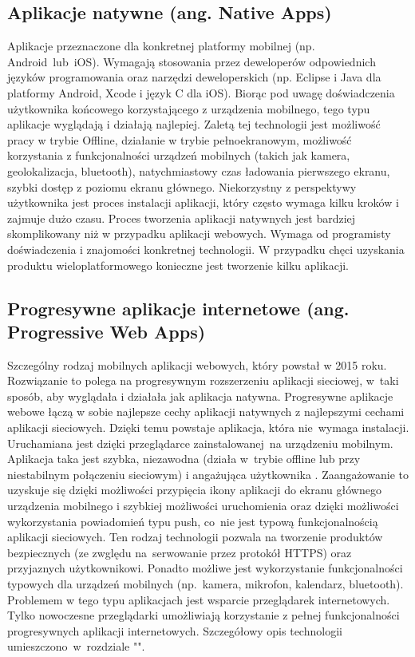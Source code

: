 \documentclass[a4paper,12pt,twoside,openany]{report}
\begin{document}
\subsection*{Aplikacje natywne (ang. Native Apps)}
\noindent Aplikacje przeznaczone dla konkretnej platformy mobilnej (np. Android~lub~iOS). Wymagają stosowania przez deweloperów odpowiednich języków programowania oraz narzędzi deweloperskich (np. Eclipse i Java dla platformy Android, Xcode i język C dla iOS). Biorąc pod uwagę do\'swiadczenia użytkownika końcowego korzystającego z urządzenia mobilnego, tego typu aplikacje wyglądają i działają najlepiej. Zaletą tej technologii jest możliwo\'sć pracy w trybie Offline, działanie w trybie pełnoekranowym, możliwo\'sć korzystania z funkcjonalno\'sci urządzeń mobilnych (takich jak kamera, geolokalizacja, bluetooth), natychmiastowy czas ładowania pierwszego ekranu, szybki dostęp z poziomu ekranu głównego. Niekorzystny z perspektywy użytkownika jest proces instalacji aplikacji, który często wymaga kilku kroków i zajmuje dużo czasu. Proces tworzenia aplikacji natywnych jest bardziej skomplikowany niż w przypadku aplikacji webowych. Wymaga od programisty do\'swiadczenia i znajomo\'sci konkretnej technologii. W przypadku chęci uzyskania produktu wieloplatformowego konieczne jest tworzenie kilku aplikacji.

\subsection*{Progresywne aplikacje internetowe (ang. Progressive Web Apps)}
\noindent Szczególny rodzaj mobilnych aplikacji webowych, który powstał w 2015 roku. Rozwiązanie to polega na progresywnym rozszerzeniu aplikacji sieciowej, w~taki sposób, aby wyglądała i działała jak aplikacja natywna. Progresywne aplikacje webowe łączą w sobie najlepsze cechy aplikacji natywnych z najlepszymi cechami aplikacji sieciowych. Dzięki temu powstaje aplikacja, która nie~wymaga instalacji. Uruchamiana jest dzięki przeglądarce zainstalowanej~na urządzeniu mobilnym. Aplikacja taka jest szybka, niezawodna (działa w~trybie offline lub przy niestabilnym połączeniu sieciowym) i angażująca użytkownika \cite{pwa}. Zaangażowanie to uzyskuje się dzięki możliwo\'sci przypięcia ikony aplikacji do ekranu głównego urządzenia mobilnego i szybkiej możliwo\'sci uruchomienia oraz dzięki możliwo\'sci wykorzystania powiadomień typu push, co~nie jest typową funkcjonalno\'scią aplikacji sieciowych. Ten rodzaj technologii pozwala na tworzenie produktów bezpiecznych (ze zwględu na~serwowanie przez protokół HTTPS) oraz przyjaznych użytkownikowi. Ponadto możliwe jest wykorzystanie funkcjonalno\'sci typowych dla urządzeń mobilnych (np.~kamera, mikrofon, kalendarz, bluetooth). Problemem w tego typu aplikacjach jest wsparcie przeglądarek internetowych. Tylko nowoczesne przeglądarki umożliwiają korzystanie z pełnej funkcjonalno\'sci progresywnych aplikacji internetowych. Szczegółowy opis technologii umieszczono~w~rozdziale "".
\end{document}
